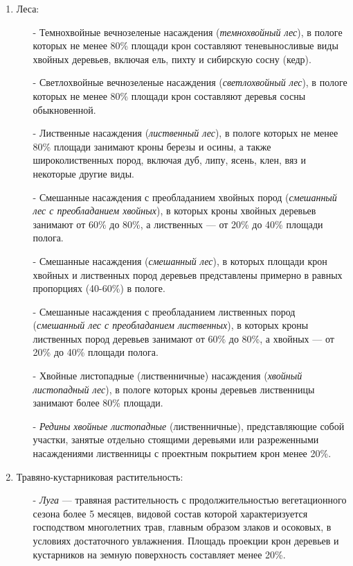 \documentclass[14pt, a4paper, oneside]{extarticle}
\begin{document}
\begin{enumerate}
    \item Леса:
    \begin{itemize}
        \item[-] Темнохвойные вечнозеленые насаждения (\textit{темнохвойный лес}), в пологе которых не менее 80\% площади крон составляют теневыносливые виды хвойных деревьев, включая ель, пихту и сибирскую сосну (кедр).
        \item[-] Светлохвойные вечнозеленые насаждения (\textit{светлохвойный лес}), в пологе которых не менее 80\% площади крон составляют деревья сосны обыкновенной.
        \item[-] Лиственные насаждения (\textit{лиственный лес}), в пологе которых не менее 80\% площади занимают кроны березы и осины, а также широколиственных пород, включая дуб, липу, ясень, клен, вяз и некоторые другие виды.
        \item[-] Смешанные насаждения с преобладанием хвойных пород (\textit{смешанный лес с преобладанием хвойных}), в которых кроны хвойных деревьев занимают от 60\% до 80\%, а лиственных --- от 20\% до 40\% площади полога.
        \item[-] Смешанные насаждения (\textit{смешанный лес}), в которых площади крон хвойных и лиственных пород деревьев представлены примерно в равных пропорциях (40-60\%) в пологе.
        \item[-] Смешанные насаждения с преобладанием лиственных пород (\textit{смешанный лес с преобладанием лиственных}), в которых кроны лиственных пород деревьев занимают от 60\% до 80\%, а хвойных --- от 20\% до 40\% площади полога.
        \item[-] Хвойные листопадные (лиственничные) насаждения (\textit{хвойный листопадный лес}), в пологе которых кроны деревьев лиственницы занимают более 80\% площади.
        \item[-] \textit{Редины хвойные листопадные} (лиственничные), представляющие собой участки, занятые отдельно стоящими деревьями или разреженными насаждениями лиственницы с проектным покрытием крон менее 20\%.
    \end{itemize}
    \item Травяно-кустарниковая растительность:
    \begin{itemize}
        \item[-] \textit{Луга} --- травяная растительность с продолжительностью вегетационного сезона более 5 месяцев, видовой состав которой характеризуется господством многолетних трав, главным образом злаков и осоковых, в условиях достаточного увлажнения. Площадь проекции крон деревьев и кустарников на земную поверхность составляет менее 20\%.

\end{itemize}
\end{enumerate}
\end{document}
